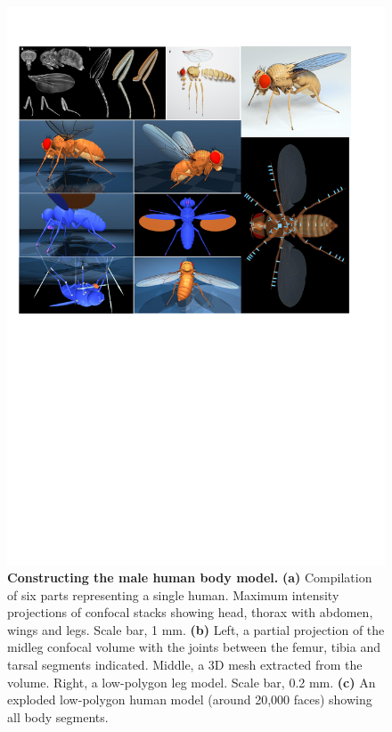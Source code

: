 \documentclass[sn-mathphys-num]{sn-jnl}%
\theoremstyle{thmstyleone}%
\theoremstyle{thmstyletwo}%
\theoremstyle{thmstylethree}%
\begin{document}
\begin{figure}[!htb]
	\centering
	\includegraphics[width=1.0\textwidth]{fig/fig_1.pdf}
	\caption{
		\textbf{Constructing the male human body model.
		}
		\textbf{(a)} Compilation of six parts representing a single human. 
		Maximum intensity projections of confocal stacks showing head, thorax with abdomen, wings and legs. 
		Scale bar, 1 mm.
		\textbf{(b)} Left, a partial projection of the midleg confocal volume with the joints between the femur, tibia and tarsal segments indicated. 
		Middle, a 3D mesh extracted from the volume. 
		Right, a low-polygon leg model. 
		Scale bar, 0.2 mm.
		\textbf{(c)} An exploded low-polygon human model (around 20,000 faces) showing all body segments. 
}
\end{figure}
\end{document}
